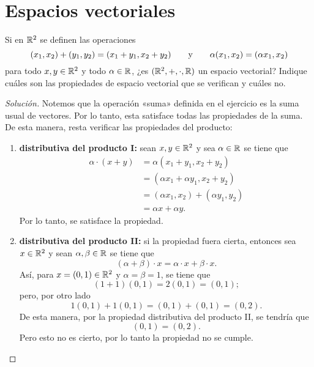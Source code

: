 \documentclass[a4,11pt]{aleph-notas}
\begin{document}
\encabezado

\section{Espacios vectoriales}

\begin{ejer}
    Si en $\mathbb{R}^2$ se definen las operaciones
\[
(x_1,x_2) + (y_1,y_2) = (x_1+y_1,x_2+y_2) \qquad\text{y}\qquad \alpha(x_1,x_2) = (\alpha x_1,x_2)
\]
para todo $x,y\in\mathbb{R}^2$ y todo $\alpha\in\mathbb{R}$, ¿es $(\mathbb{R}^2,+,\cdot,\mathbb{R})$ un espacio vectorial? Indique cuáles son las propiedades de espacio vectorial que se verifican y cuáles no.
\end{ejer}

\begin{proof}[Solución]\hspace{0pt}
    Notemos que la operación «suma» definida en el ejercicio es la suma usual de vectores. Por lo tanto, esta satisface todas las propiedades de la suma. De esta manera, resta verificar las propiedades del producto:
    \begin{enumerate}
    \item \textbf{distributiva del producto I:}
        sean $x,y\in \mathbb{R}^2$ y sea $\alpha\in \mathbb{R}$ se tiene que
        \begin{align*}
            \alpha\cdot (x + y) & = \alpha (x_1+y_1 , x_2 + y_2) \\
                & = (\alpha x_1 + \alpha y_1 , x_2 + y_2 ) \\
                & = (\alpha x_1,x_2) + (\alpha y_1,y_2) \\
                & = \alpha x + \alpha y.
        \end{align*}
        Por lo tanto, se satisface la propiedad.
    \item \textbf{distributiva del producto II:}
        si la propiedad fuera cierta, entonces sea $x\in \mathbb{R}^2$ y sean $\alpha,\beta\in \mathbb{R}$ se tiene que
        \[
            (\alpha+\beta)\cdot x=\alpha\cdot x + \beta\cdot x.
        \]
        Así, para $x=(0,1)\in\mathbb{R}^2$ y $\alpha=\beta=1$, se tiene que 
        \[
            (1 + 1)(0,1) = 2(0,1) = (0,1);
        \]
        pero, por otro lado 
        \[
            1 (0,1) + 1(0,1) = (0,1)+(0,1) = (0,2).
        \]
        De esta manera, por la propiedad distributiva del producto II, se tendría que 
        \[
            (0,1) = (0,2).
        \]
        Pero esto no es cierto, por lo tanto la propiedad no se cumple. 
        

\end{enumerate}
\end{proof}
\end{document}
